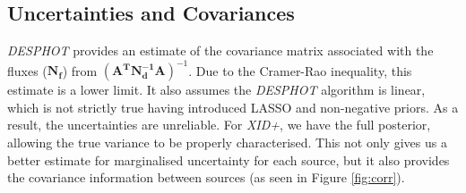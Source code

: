 \documentclass[useAMS,usenatbib]{mnras}
\begin{document}
\subsection{Uncertainties and Covariances}
\emph{DESPHOT} provides an estimate of the covariance matrix associated with the fluxes ($\mathbf{N_f}$) from $(\mathbf{A^TN_d^{-1}A})^{-1}$. Due to the Cramer-Rao inequality, this estimate is a lower limit. It also assumes the \emph{DESPHOT} algorithm is linear, which is not strictly true having introduced LASSO and non-negative priors. As a result, the uncertainties are unreliable. For \emph{XID+}, we have the full posterior, allowing the true variance to be properly characterised. This not only gives us a better estimate for marginalised uncertainty for each source, but it also provides the covariance information between sources (as seen in Figure \ref{fig:corr}). 
%

\end{document}

